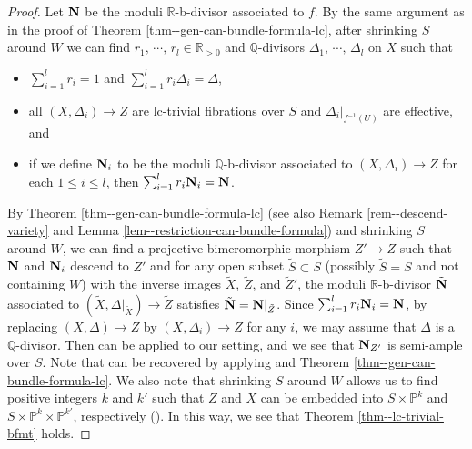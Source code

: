 \documentclass[12pt]{amsart}
\theoremstyle{definition}
\begin{document}
\begin{proof}
Let $\boldsymbol{\rm N}$ be the moduli $\mathbb{R}$-b-divisor associated to $f$. 
By the same argument as in the proof of Theorem \ref{thm--gen-can-bundle-formula-lc}, after shrinking $S$ around $W$ we can find $r_{1},\,\cdots,\, r_{l}\in \mathbb{R}_{>0}$ and $\mathbb{Q}$-divisors $\Delta_{1},\,\cdots,\,\Delta_{l}$ on $X$ such that
\begin{itemize}
\item
$\sum_{i=1}^{l}r_{i}=1$ and $\sum_{i=1}^{l}r_{i}\Delta_{i}=\Delta$, 
\item
all $(X,\Delta_{i})\to Z$ are lc-trivial fibrations over $S$ and $\Delta_{i}|_{f^{-1}(U)}$ are effective, and 
\item
if we define $\boldsymbol{\rm N}_{i}$ to be the moduli $\mathbb{Q}$-b-divisor associated to $(X,\Delta_{i})\to Z$ for each $1 \leq i \leq l$, then $\sum_{i=1}^{l}r_{i}\boldsymbol{\rm N}_{i}=\boldsymbol{\rm N}$. %
\end{itemize}
By Theorem \ref{thm--gen-can-bundle-formula-lc} (see also Remark \ref{rem--descend-variety} and Lemma \ref{lem--restriction-can-bundle-formula}) and shrinking $S$ around $W$, we can find a projective bimeromorphic morphism $Z' \to Z$ such that $\boldsymbol{\rm N}$ and $\boldsymbol{\rm N}_{i}$ descend to $Z'$ and for any open subset $\tilde{S} \subset S$ (possibly $\tilde{S}=S$ and not containing $W$) with the inverse images $\tilde{X}$, $\tilde{Z}$, and $\tilde{Z}'$, the moduli $\mathbb{R}$-b-divisor $\tilde{\boldsymbol{\rm N}}$ associated to $(\tilde{X},\Delta|_{\tilde{X}}) \to \tilde{Z}$ satisfies $\tilde{\boldsymbol{\rm N}}=\boldsymbol{\rm N}|_{\tilde{Z}}$. 
Since $\sum_{i=1}^{l}r_{i}\boldsymbol{\rm N}_{i}=\boldsymbol{\rm N}$, by replacing $(X,\Delta) \to Z$ by $(X,\Delta_{i})\to Z$ for any $i$, we may assume that $\Delta$ is a $\mathbb{Q}$-divisor. 
Then \cite[Proof of Theorem 7.3]{bfmt} can be applied to our setting, and we see that $\boldsymbol{\rm N}_{Z'}$ is semi-ample over $S$. 
Note that \cite[Remark 7.4]{bfmt} can be recovered by applying \cite[Proof of Theorem 1.1]{fg-lctrivial} and Theorem \ref{thm--gen-can-bundle-formula-lc}. 
We also note that shrinking $S$ around $W$ allows us to find positive integers $k$ and $k'$ such that $Z$ and $X$ can be embedded into $S \times \mathbb{P}^{k}$ and $S \times \mathbb{P}^{k}\times \mathbb{P}^{k'}$, respectively (\cite[Lemma 2.2]{eh-semistablereduction}). 
In this way, we see that Theorem \ref{thm--lc-trivial-bfmt} holds. 
\end{proof}
\end{document}
